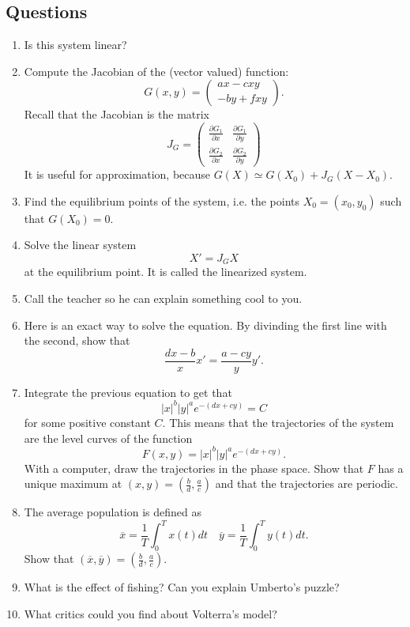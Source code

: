 \subsection{Questions}
\begin{enumerate}
\item Is this system linear?
\item Compute the Jacobian of the (vector valued) function:
\[ G(x,y) = \begin{pmatrix} ax -cxy \\ -by +fxy  \end{pmatrix}.\]
Recall that the Jacobian is the matrix 
\[J_G = \begin{pmatrix} \frac{\partial G_1}{\partial x } & \frac{\partial G_1}{\partial y } \\ \frac{\partial G_2}{\partial x} & \frac{\partial G_2}{\partial y} \end{pmatrix} \]
It is useful for approximation, because $G(X) \simeq G(X_0) + J_G (X-X_0)$. 
\item Find the equilibrium points of the system, i.e. the points $X_0 = (x_0, y_0)$ such that $G(X_0) = 0$.
\item Solve the linear system
\[X' = J_G X\]
at the equilibrium point. It is called the linearized system.
\item Call the teacher so he can explain something cool to you.
\item Here is an exact way to solve the equation. By divinding the first line with the second, show that \[\frac{dx-b}{x} x'= \frac{a-cy }{y }y'. \]
\item Integrate the previous equation to get that 
\[ |x|^b|y|^a e^{-(dx + cy)} = C\]
for some positive constant $C$. This means that the trajectories of the system are the level curves of the function \[F(x,y) = |x|^b|y|^a e^{-(dx + cy)}.\] With a computer, draw the trajectories in the phase space. Show that $F$ has a unique maximum at $(x,y)=(\frac{b}{d} , \frac{a}{c})$ and that the trajectories are periodic.
\item The average population is defined as 
\[\overline x = \frac{1}{T}\int_0^T x(t)dt \quad \overline y = \frac{1}{T}\int_0^T y(t)dt.\]
Show that $(\overline x , \overline y ) =(\frac{b}{d} , \frac{a}{c})$.
\item What is the effect of fishing? Can you explain Umberto's puzzle?
\item What critics could you find about Volterra's model?
\end{enumerate}
 
